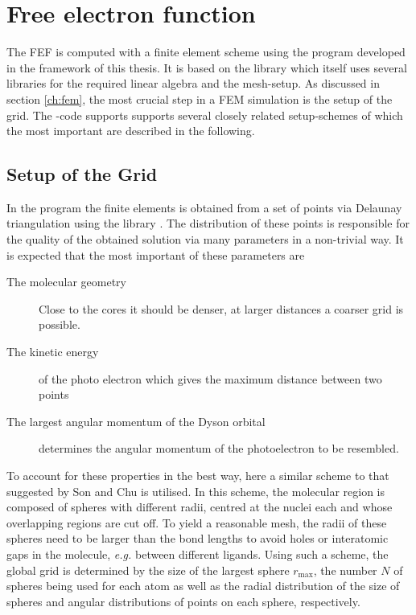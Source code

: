 \section{Free electron function}
The FEF is computed with a finite element scheme using the program  \cite{FreeWilly} developed in the framework of this thesis.
It is based on the library  \cite{libmesh} which itself uses several libraries for the required linear algebra and the mesh-setup.
As discussed in section \ref{ch:fem}, the most crucial step in a FEM simulation is the setup of the grid.
The -code supports supports several closely related setup-schemes of which the most important are described in the following.

\subsection{Setup of the Grid}
\label{sec:grid}
In the program  the finite elements is obtained from a set of points via Delaunay triangulation %
using the library  \cite{tetgen}.
The distribution of these points is responsible for the quality of the obtained solution via many parameters in a non-trivial way.
It is expected that the most important of these parameters are
\begin{description}
   \item[The molecular geometry] Close to the cores it should be denser, at larger distances a coarser grid is possible.
   \item[The kinetic energy] of the photo electron which gives the maximum distance between two points
   \item[The largest angular momentum of the Dyson orbital] determines the angular momentum of the photoelectron to be resembled.
\end{description}

To account for these properties in the best way, here a similar scheme to that suggested by Son and Chu \cite{Son_Chu} is utilised.
In this scheme, the molecular region is composed of spheres with different radii, centred at the nuclei each and whose overlapping regions are cut off.
To yield a reasonable mesh, the radii of these spheres need to be larger than the bond lengths to avoid holes or interatomic gaps in the molecule, \textit{e.g.} between different ligands.
Using such a scheme, the global grid is determined by the size of the largest sphere $r_\text{max}$, the number $N$ of spheres being used for each atom as well as the radial distribution of the size of spheres and angular distributions of points on each sphere, respectively.

